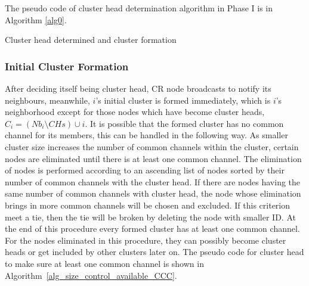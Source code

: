 The pseudo code of cluster head determination algorithm in Phase I is in Algorithm \ref{alg0}.
\begin{algorithm}              %
\caption{Cluster head determined and cluster formation}          %
\label{alg0} 
\DontPrintSemicolon
\SetAlgoLined
{}
\end{algorithm}


\subsubsection{Initial Cluster Formation}
After deciding itself being cluster head, CR node broadcasts to notify its neighbours, meanwhile, $i$'s initial cluster is formed immediately, which is $i$'s neighborhood except for those nodes which have become cluster heads, \ie $C_i=(Nb_i\setminus CHs)\cup i$.
It is possible that the formed cluster has no common channel for its members, this can be handled in the following way. 
As smaller cluster size increases the number of common channels within the cluster, certain nodes are  eliminated until there is at least one common channel.
The elimination of nodes is performed according to an ascending list of nodes sorted by their number of common channels with the cluster head.
If there are nodes having the same number of common channels with cluster head, the node whose elimination brings in more common channels will be chosen and excluded.
If this criterion meet a tie, then the tie will be broken by deleting the node with smaller ID.
At the end of this procedure every formed cluster has at least one common channel.
For the nodes eliminated in this procedure, they can possibly become cluster heads or get included by other clusters later on. 
The pseudo code for cluster head to make sure at least one common channel is shown in Algorithm~\ref{alg_size_control_available_CCC}.

